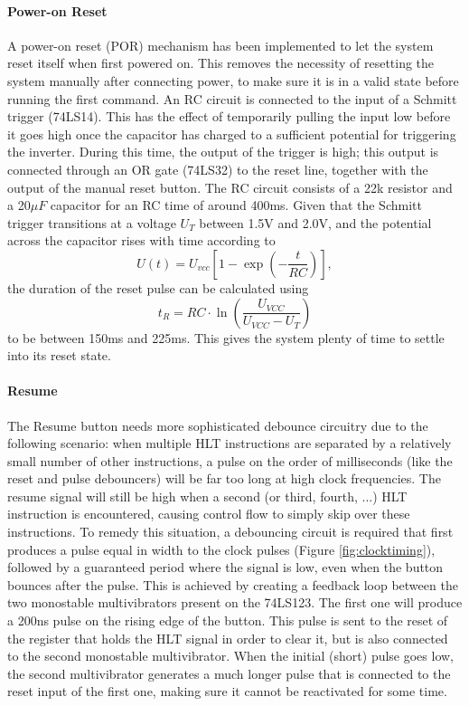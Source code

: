\paragraph{Power-on Reset} A power-on reset (POR) mechanism has been implemented to let the system reset itself when first powered on. This removes the necessity of resetting the system manually after connecting power, to make sure it is in a valid state before running the first command. An RC circuit is connected to the input of a Schmitt trigger (74LS14). This has the effect of temporarily pulling the input low before it goes high once the capacitor has charged to a sufficient potential for triggering the inverter. During this time, the output of the trigger is high; this output is connected through an OR gate (74LS32) to the reset line, together with the output of the manual reset button. The RC circuit consists of a 22k resistor and a 20$\mu F$ capacitor for an RC time of around 400ms. Given that the Schmitt trigger transitions at a voltage $U_T$ between 1.5V and 2.0V, and the potential across the capacitor rises with time according to
$$ U(t) = U_{vcc}\left[1-\exp\left(-\frac{t}{RC}\right)\right],$$
the duration of the reset pulse can be calculated using
$$ t_R = RC\cdot\ln\left(\frac{U_{VCC}}{U_{VCC}-U_T}\right)$$
to be between 150ms and 225ms. This gives the system plenty of time to settle into its reset state.



\paragraph{Resume} The Resume button needs more sophisticated debounce circuitry due to the following scenario: when multiple HLT instructions are separated by a relatively small number of other instructions, a pulse on the order of milliseconds (like the reset and pulse debouncers) will be far too long at high clock frequencies. The resume signal will still be high when a second (or third, fourth, ...) HLT instruction is encountered, causing control flow to simply skip over these instructions. To remedy this situation, a debouncing circuit is required that first produces a pulse equal in width to the clock pulses (Figure \ref{fig:clocktiming}), followed by a guaranteed period where the signal is low, even when the button bounces after the pulse. This is achieved by creating a feedback loop between the two monostable multivibrators present on the 74LS123. The first one will produce a 200ns pulse on the rising edge of the button. This pulse is sent to the reset of the register that holds the HLT signal in order to clear it, but is also connected to the second monostable multivibrator. When the initial (short) pulse goes low, the second multivibrator generates a much longer pulse that is connected to the reset input of the first one, making sure it cannot be reactivated for some time.

